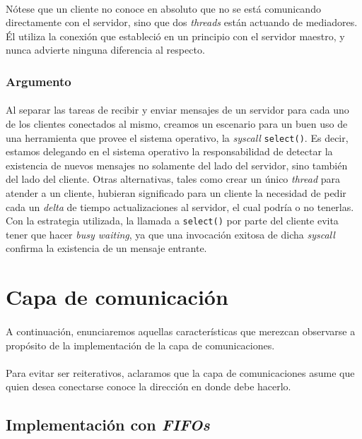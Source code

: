 \documentclass[spanish]{article}
\begin{document}
\paragraph{} Nótese que un cliente no conoce en absoluto que no se está comunicando directamente con el servidor, sino que dos \textit{threads} están actuando de mediadores. Él utiliza la conexión que estableció en un principio con el servidor maestro, y nunca advierte ninguna diferencia al respecto.
\subsubsection{Argumento}
\paragraph{} Al separar las tareas de recibir y enviar mensajes de un servidor para cada uno de los clientes conectados al mismo, creamos un escenario para un buen uso de una herramienta que provee el sistema operativo, la \textit{syscall} \verb|select()|. Es decir, estamos delegando en el sistema operativo la responsabilidad de detectar la existencia de nuevos mensajes no solamente del lado del servidor, sino también del lado del cliente. Otras alternativas, tales como crear un único \textit{thread} para atender a un cliente, hubieran significado para un cliente la necesidad de pedir cada un \textit{delta} de tiempo actualizaciones al servidor, el cual podría o no tenerlas. Con la estrategia utilizada, la llamada a \verb|select()| por parte del cliente evita tener que hacer \textit{busy waiting}, ya que una invocación exitosa de dicha \textit{syscall} confirma la existencia de un mensaje entrante.   
\section{Capa de comunicación}
\paragraph{} A continuación, enunciaremos aquellas características que merezcan observarse a propósito de la implementación de la capa de comunicaciones.
\paragraph{} Para evitar ser reiterativos, aclaramos que la capa de comunicaciones asume que quien desea conectarse conoce la dirección en donde debe hacerlo.
\subsection{Implementación con \textit{FIFOs}}
\end{document}
